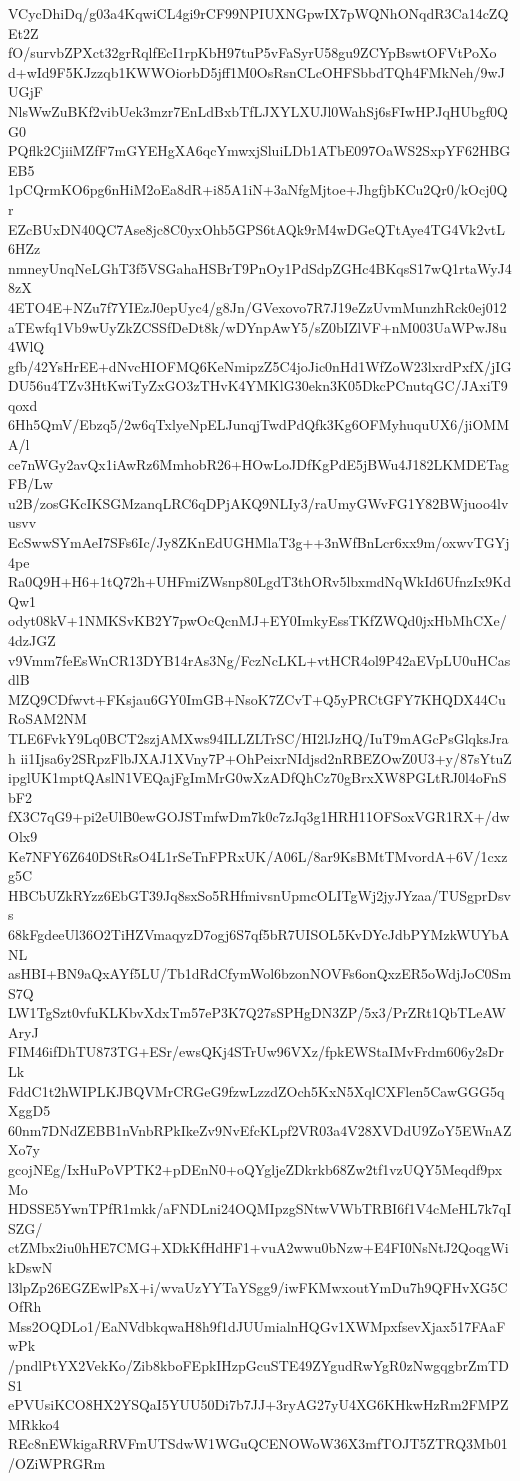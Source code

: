 VCycDhiDq/g03a4KqwiCL4gi9rCF99NPIUXNGpwIX7pWQNhONqdR3Ca14cZQEt2Z
fO/survbZPXct32grRqlfEcI1rpKbH97tuP5vFaSyrU58gu9ZCYpBswtOFVtPoXo
d+wId9F5KJzzqb1KWWOiorbD5jff1M0OsRsnCLcOHFSbbdTQh4FMkNeh/9wJUGjF
NlsWwZuBKf2vibUek3mzr7EnLdBxbTfLJXYLXUJl0WahSj6sFIwHPJqHUbgf0QG0
PQflk2CjiiMZfF7mGYEHgXA6qcYmwxjSluiLDb1ATbE097OaWS2SxpYF62HBGEB5
1pCQrmKO6pg6nHiM2oEa8dR+i85A1iN+3aNfgMjtoe+JhgfjbKCu2Qr0/kOcj0Qr
EZcBUxDN40QC7Ase8jc8C0yxOhb5GPS6tAQk9rM4wDGeQTtAye4TG4Vk2vtL6HZz
nmneyUnqNeLGhT3f5VSGahaHSBrT9PnOy1PdSdpZGHc4BKqsS17wQ1rtaWyJ48zX
4ETO4E+NZu7f7YIEzJ0epUyc4/g8Jn/GVexovo7R7J19eZzUvmMunzhRck0ej012
aTEwfq1Vb9wUyZkZCSSfDeDt8k/wDYnpAwY5/sZ0bIZlVF+nM003UaWPwJ8u4WlQ
gfb/42YsHrEE+dNvcHIOFMQ6KeNmipzZ5C4joJic0nHd1WfZoW23lxrdPxfX/jIG
DU56u4TZv3HtKwiTyZxGO3zTHvK4YMKlG30ekn3K05DkcPCnutqGC/JAxiT9qoxd
6Hh5QmV/Ebzq5/2w6qTxlyeNpELJunqjTwdPdQfk3Kg6OFMyhuquUX6/jiOMMA/l
ce7nWGy2avQx1iAwRz6MmhobR26+HOwLoJDfKgPdE5jBWu4J182LKMDETagFB/Lw
u2B/zosGKcIKSGMzanqLRC6qDPjAKQ9NLIy3/raUmyGWvFG1Y82BWjuoo4lvusvv
EcSwwSYmAeI7SFs6Ic/Jy8ZKnEdUGHMlaT3g++3nWfBnLcr6xx9m/oxwvTGYj4pe
Ra0Q9H+H6+1tQ72h+UHFmiZWsnp80LgdT3thORv5lbxmdNqWkId6UfnzIx9KdQw1
odyt08kV+1NMKSvKB2Y7pwOcQcnMJ+EY0ImkyEssTKfZWQd0jxHbMhCXe/4dzJGZ
v9Vmm7feEsWnCR13DYB14rAs3Ng/FczNcLKL+vtHCR4ol9P42aEVpLU0uHCasdlB
MZQ9CDfwvt+FKsjau6GY0ImGB+NsoK7ZCvT+Q5yPRCtGFY7KHQDX44CuRoSAM2NM
TLE6FvkY9Lq0BCT2szjAMXws94ILLZLTrSC/HI2lJzHQ/IuT9mAGcPsGlqksJrah
ii1Ijsa6y2SRpzFlbJXAJ1XVny7P+OhPeixrNIdjsd2nRBEZOwZ0U3+y/87sYtuZ
ipglUK1mptQAslN1VEQajFgImMrG0wXzADfQhCz70gBrxXW8PGLtRJ0l4oFnSbF2
fX3C7qG9+pi2eUlB0ewGOJSTmfwDm7k0c7zJq3g1HRH11OFSoxVGR1RX+/dwOlx9
Ke7NFY6Z640DStRsO4L1rSeTnFPRxUK/A06L/8ar9KsBMtTMvordA+6V/1cxzg5C
HBCbUZkRYzz6EbGT39Jq8sxSo5RHfmivsnUpmcOLITgWj2jyJYzaa/TUSgprDsvs
68kFgdeeUl36O2TiHZVmaqyzD7ogj6S7qf5bR7UISOL5KvDYcJdbPYMzkWUYbANL
asHBI+BN9aQxAYf5LU/Tb1dRdCfymWol6bzonNOVFs6onQxzER5oWdjJoC0SmS7Q
LW1TgSzt0vfuKLKbvXdxTm57eP3K7Q27sSPHgDN3ZP/5x3/PrZRt1QbTLeAWAryJ
FIM46ifDhTU873TG+ESr/ewsQKj4STrUw96VXz/fpkEWStaIMvFrdm606y2sDrLk
FddC1t2hWIPLKJBQVMrCRGeG9fzwLzzdZOch5KxN5XqlCXFlen5CawGGG5qXggD5
60nm7DNdZEBB1nVnbRPkIkeZv9NvEfcKLpf2VR03a4V28XVDdU9ZoY5EWnAZXo7y
gcojNEg/IxHuPoVPTK2+pDEnN0+oQYgljeZDkrkb68Zw2tf1vzUQY5Meqdf9pxMo
HDSSE5YwnTPfR1mkk/aFNDLni24OQMIpzgSNtwVWbTRBI6f1V4cMeHL7k7qISZG/
ctZMbx2iu0hHE7CMG+XDkKfHdHF1+vuA2wwu0bNzw+E4FI0NsNtJ2QoqgWikDswN
l3lpZp26EGZEwlPsX+i/wvaUzYYTaYSgg9/iwFKMwxoutYmDu7h9QFHvXG5COfRh
Mss2OQDLo1/EaNVdbkqwaH8h9f1dJUUmialnHQGv1XWMpxfsevXjax517FAaFwPk
/pndlPtYX2VekKo/Zib8kboFEpkIHzpGcuSTE49ZYgudRwYgR0zNwgqgbrZmTDS1
ePVUsiKCO8HX2YSQaI5YUU50Di7b7JJ+3ryAG27yU4XG6KHkwHzRm2FMPZMRkko4
REc8nEWkigaRRVFmUTSdwW1WGuQCENOWoW36X3mfTOJT5ZTRQ3Mb01/OZiWPRGRm
